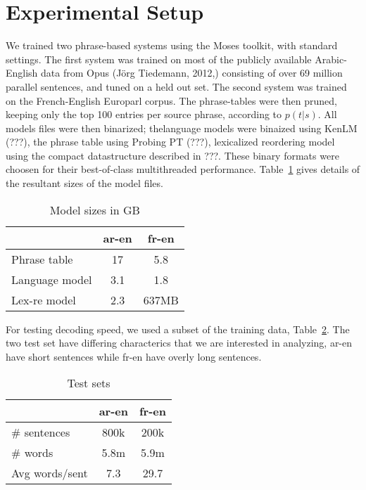 \documentclass[11pt]{article}
\begin{document}
\section{Experimental Setup}

We trained two phrase-based systems using the Moses toolkit, with standard settings. The first system was trained on most of the publicly available Arabic-English data from Opus (Jörg Tiedemann, 2012,) consisting of over 69 million parallel sentences, and tuned on a held out set. The second system was trained on the French-English Europarl corpus. The phrase-tables were then pruned, keeping only the top 100 entries per source phrase, according to $p(t|s)$. All models files were then binarized; thelanguage models were binaized using KenLM (???), the phrase table using Probing PT (???), lexicalized reordering model using the compact datastructure described in ???. These binary formats were choosen for their best-of-class multithreaded performance. Table~\ref{tab:model-files} gives details of the resultant sizes of the model files.
\begin{table}[h]
\begin{center}
\begin{tabular}{|l|c|c|} \hline
		& ar-en	& fr-en \\ \hline
Phrase table  	& 17 	& 5.8 \\
Language model 	& 3.1  	& 1.8 \\ 
Lex-re model	& 2.3	& 637MB \\ \hline
\end{tabular}
\end{center}
\caption{Model sizes in GB}
\label{tab:model-files}
\end{table}

For testing decoding speed, we used a subset of the training data, Table~\ref{tab:test-sets}. The two test set have differing characterics that we are interested in analyzing, ar-en have short sentences while fr-en have overly long sentences.

\begin{table}[h]
\begin{center}
\begin{tabular}{|l|c|c|} \hline
		& ar-en	& fr-en \\ \hline
\# sentences  	& 800k 	& 200k \\
\# words 	& 5.8m 	& 5.9m \\ 
Avg words/sent	& 7.3	& 29.7 \\ \hline
\end{tabular}
\end{center}
\caption{Test sets}
\label{tab:test-sets}
\end{table}
\end{document}
